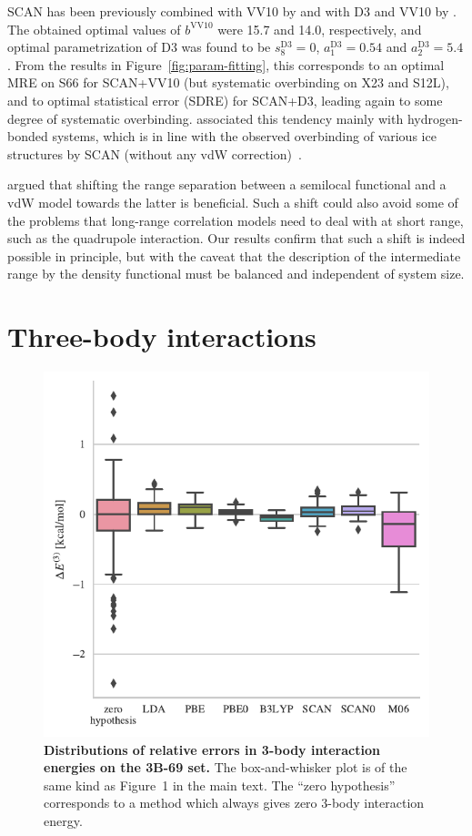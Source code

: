 SCAN has been previously combined with VV10 by \citet{PengPRX16} and with D3 and VV10 by \citet{BrandenburgPRB16}.
The obtained optimal values of $b^\text{VV10}$ were 15.7 and 14.0, respectively, and optimal parametrization of D3 was found to be $s_8^\text{D3}=0$, $a_1^\text{D3}=0.54$ and $a_2^\text{D3}=5.4$.
From the results in Figure~\ref{fig:param-fitting}, this corresponds to an optimal MRE on S66 for SCAN+VV10 (but systematic overbinding on X23 and S12L), and to optimal statistical error (SDRE) for SCAN+D3, leading again to some degree of systematic overbinding.
\citet{BrandenburgPRB16} associated this tendency mainly with hydrogen-bonded systems, which is in line with the observed overbinding of various ice structures by SCAN (without any vdW correction)~\cite{ChenPRB16}.

\citet{PengPRX16} argued that shifting the range separation between a semilocal functional and a vdW model towards the latter is beneficial.
Such a shift could also avoid some of the problems that long-range correlation models need to deal with at short range, such as the quadrupole interaction.
Our results confirm that such a shift is indeed possible in principle, but with the caveat that the description of the intermediate range by the density functional must be balanced and independent of system size.

\section{Three-body interactions}

\begin{figure}[t]
\includegraphics[center]{media/3-body}
\caption{\textbf{Distributions of relative errors in 3-body interaction energies on the 3B-69 set.}
The box-and-whisker plot is of the same kind as Figure~1 in the main text.
The ``zero hypothesis'' corresponds to a method which always gives zero 3-body interaction energy.
}\label{fig:3-body}
\end{figure}

